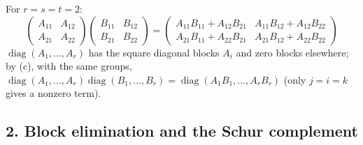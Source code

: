 \documentclass[12pt]{article}
\DeclareMathOperator{\diag}{diag}
\theoremstyle{definition}
\begin{document}
For \(r=s=t=2\):
\[
\begin{pmatrix}A_{11}&A_{12}\\A_{21}&A_{22}\end{pmatrix}\begin{pmatrix}B_{11}&B_{12}\\B_{21}&B_{22}\end{pmatrix}
=\begin{pmatrix}A_{11}B_{11}+A_{12}B_{21}&A_{11}B_{12}+A_{12}B_{22}\\A_{21}B_{11}+A_{22}B_{21}&A_{21}B_{12}+A_{22}B_{22}\end{pmatrix}
\]
\(\diag(A_1,\dots,A_r)\) has the square diagonal blocks \(A_i\) and zero blocks elsewhere; by (c), with the same groups,
\(\diag(A_1,\dots,A_r)\diag(B_1,\dots,B_r)=\diag(A_1B_1,\dots,A_rB_r)\) (only \(j=i=k\) gives a nonzero term).

\subsection*{2. Block elimination and the Schur complement}
\end{document}

